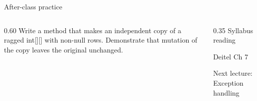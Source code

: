 \documentclass[10pt,aspectratio=169]{beamer}
\begin{document}
\begin{frame}[fragile,t]{After-class practice}
\begin{columns}[T,onlytextwidth]\begin{column}{0.60\textwidth}
Write a method that makes an independent copy of a ragged int[][] with non-null rows. Demonstrate that mutation of the copy leaves the original unchanged.
\end{column}\begin{column}{0.35\textwidth}\small
Syllabus reading\par Deitel Ch 7

Next lecture: Exception handling
\end{column}\end{columns}
\end{frame}
\end{document}
